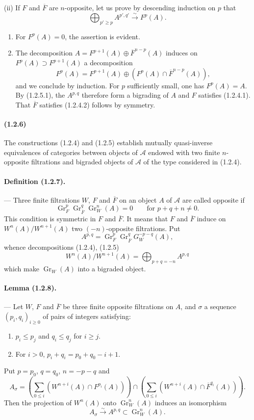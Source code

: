 \documentclass[10pt]{article}
\newcommand{\Gr}{\operatorname{Gr}}
\newcommand{\calA}{\mathcal A}
\newcommand{\iso}{\xrightarrow{\sim}}
\begin{document}
(ii) If $F$ and $\overline F$ are $n$-opposite, let us prove by descending induction on $p$ that
\[
\tag{1.2.5.1}
\bigoplus_{p'\ge p} A^{p',q'}\iso F^p(A).
\]
\begin{enumerate}[label=\alph*)]
\item For $F^p(A)=0$, the assertion is evident.
\item The decomposition $A=F^{p+1}(A)\oplus\overline F^{n-p}(A)$ induces on $F^p(A)\supset F^{p+1}(A)$ a decomposition
\[
F^p(A)=F^{p+1}(A)\oplus(F^p(A)\cap\overline F^{n-p}(A)),
\]
and we conclude by induction. For $p$ sufficiently small, one has $F^p(A)=A$. By (1.2.5.1), the $A^{p,q}$ therefore form a bigrading of $A$ and $F$ satisfies (1.2.4.1). That $\overline F$ satisfies (1.2.4.2) follows by symmetry.
\end{enumerate}

\paragraph{(1.2.6)} The constructions (1.2.4) and (1.2.5) establish mutually quasi-inverse equivalences of categories between objects of $\calA$ endowed with two finite $n$-opposite filtrations and bigraded objects of $\calA$ of the type considered in (1.2.4).

\paragraph{Definition (1.2.7).} --- Three finite filtrations $W$, $F$ and $\overline F$ on an object $A$ of $\calA$ are called opposite if
\[
\Gr_F^p\Gr_{\overline F}^{q}\Gr_W^n(A)=0\qquad\text{for }p+q+n\ne0.
\]
This condition is symmetric in $F$ and $\overline F$. It means that $F$ and $\overline F$ induce on $W^n(A)/W^{n+1}(A)$ two $(-n)$-opposite filtrations. Put
\[
A^{p,q}=\Gr_F^p\Gr_{\overline F}^{q}G_W^{-p-q}(A),
\]
whence decompositions (1.2.4), (1.2.5)
\[
\tag{1.2.7.1}
W^n(A)/W^{n+1}(A)=\bigoplus_{p+q=-n}A^{p,q}
\]
which make $\Gr_W(A)$ into a bigraded object.

\paragraph{Lemma (1.2.8).} --- Let $W$, $F$ and $\overline F$ be three finite opposite filtrations on $A$, and $\sigma$ a sequence $(p_i,q_i)_{i\ge0}$ of pairs of integers satisfying:
\begin{enumerate}[label=\alph*)]
\item $p_i\le p_j$ and $q_i\le q_j$ for $i\ge j$.
\item For $i>0$, $p_i+q_i=p_0+q_0-i+1$.
\end{enumerate}
Put $p=p_0$, $q=q_0$, $n=-p-q$ and
\[
A_\sigma=\left(\sum_{0\le i} (W^{n+i}(A)\cap F^{p_i}(A))\right)
\cap
\left(\sum_{0\le i} (W^{n+i}(A)\cap \overline F^{q_i}(A))\right).
\]
Then the projection of $W^n(A)$ onto $\Gr_W^n(A)$ induces an isomorphism
\[
A_\sigma\iso A^{p,q}\subset\Gr_W^n(A).
\]
\end{document}
